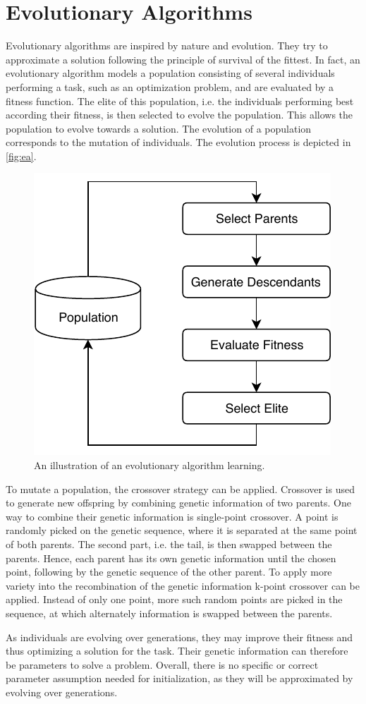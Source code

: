 \section{Evolutionary Algorithms}
Evolutionary algorithms are inspired by nature and evolution.
They try to approximate a solution following the principle of survival of the fittest.
In fact, an evolutionary algorithm models a population consisting of several individuals performing a task, such as an optimization problem, and are evaluated by a fitness function.
The elite of this population, i.e. the individuals performing best according their fitness, is then selected to evolve the population.
This allows the population to evolve towards a solution.
The evolution of a population corresponds to the mutation of individuals.
The evolution process is depicted in \autoref{fig:ea}.

\begin{figure}[h]
\centering
\includegraphics[width=.7\columnwidth]{figures/ea_fig.pdf}
\caption{An illustration of an evolutionary algorithm learning.}
\label{fig:ea}
\end{figure}

To mutate a population, the crossover strategy can be applied.
Crossover is used to generate new offspring by combining genetic information of two parents.
One way to combine their genetic information is single-point crossover.
A point is randomly picked on the genetic sequence, where it is separated at the same point of both parents.
The second part, i.e. the tail, is then swapped between the parents.
Hence, each parent has its own genetic information until the chosen point, following by the genetic sequence of the other parent.
To apply more variety into the recombination of the genetic information k-point crossover can be applied.
Instead of only one point, more such random points are picked in the sequence, at which alternately information is swapped between the parents.

As individuals are evolving over generations, they may improve their fitness and thus optimizing a solution for the task.
Their genetic information can therefore be parameters to solve a problem.
Overall, there is no specific or correct parameter assumption needed for initialization, as they will be approximated by evolving over generations.
